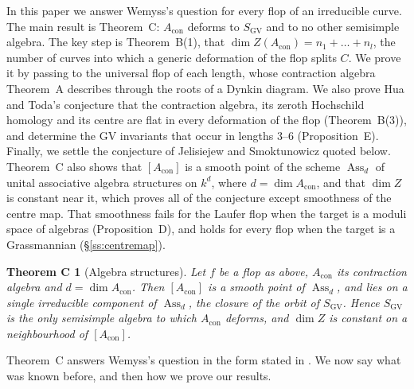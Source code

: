 \documentclass[11pt]{amsart}
\makeatletter
\numberwithin{table}{section}
\numberwithin{figure}{section}
\numberwithin{equation}{section}
\theoremstyle{definition}
\theoremstyle{plain}
\newtheorem*{thmC}{Theorem C}
\newcommand{\Acon}{A_{\mathrm{con}}}
\newcommand{\SGV}{S_{\mathrm{GV}}}
\DeclareMathOperator{\Ass}{Ass}
\renewcommand\paragraph{\@startsection{paragraph}{4}{\z@}{\medskipamount}{-.5em}{\normalfont\bfseries}}
\makeatother
\begin{document}
\paragraph{Results.} In this paper we answer Wemyss's question for every flop of an irreducible curve. The main result is Theorem~C: $\Acon$ deforms to $\SGV$ and to no other semisimple algebra. The key step is Theorem~B(1), that $\dim Z(\Acon) = n_1 + \dots + n_l$, the number of curves into which a generic deformation of the flop splits $C$. We prove it by passing to the universal flop of each length, whose contraction algebra Theorem~A describes through the roots of a Dynkin diagram. We also prove Hua and Toda's conjecture that the contraction algebra, its zeroth Hochschild homology and its centre are flat in every deformation of the flop (Theorem~B(3)), and determine the GV invariants that occur in lengths $3$--$6$ (Proposition~E). Finally, we settle the conjecture of Jelisiejew and Smoktunowicz quoted below. Theorem~C also shows that $[\Acon]$ is a smooth point of the scheme $\Ass_d$ of unital associative algebra structures on $k^d$, where $d = \dim \Acon$, and that $\dim Z$ is constant near it, which proves all of the conjecture except smoothness of the centre map. That smoothness fails for the Laufer flop when the target is a moduli space of algebras (Proposition~D), and holds for every flop when the target is a Grassmannian (\S\ref{ss:centremap}).

\begin{thmC}[Algebra structures]
Let $f$ be a flop as above, $\Acon$ its contraction algebra and $d = \dim \Acon$. Then $[\Acon]$ is a smooth point of $\Ass_d$, and lies on a single irreducible component of $\Ass_d$, the closure of the orbit of $\SGV$. Hence $\SGV$ is the only semisimple algebra to which $\Acon$ deforms, and $\dim Z$ is constant on a neighbourhood of $[\Acon]$.
\end{thmC}

Theorem~C answers Wemyss's question in the form stated in \cite[Question~1.2]{JS}. We now say what was known before, and then how we prove our results.
\end{document}
